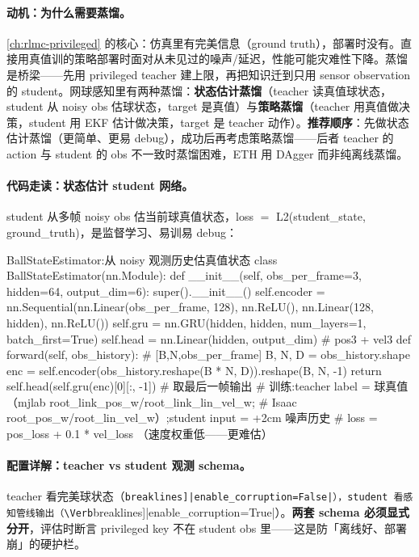 \paragraph{动机：为什么需要蒸馏。}\cref{ch:rlmc-privileged} 的核心：仿真里有完美信息（ground truth），部署时没有。直接用真值训的策略部署时面对从未见过的噪声/延迟，性能可能灾难性下降。蒸馏是桥梁——先用 privileged teacher 建上限，再把知识迁到只用 sensor observation 的 student。网球感知里有两种蒸馏：\textbf{状态估计蒸馏}（teacher 读真值球状态，student 从 noisy obs 估球状态，target 是真值）与\textbf{策略蒸馏}（teacher 用真值做决策，student 用 EKF 估计做决策，target 是 teacher 动作）。\textbf{推荐顺序}：先做状态估计蒸馏（更简单、更易 debug），成功后再考虑策略蒸馏——后者 teacher 的 action 与 student 的 obs 不一致时蒸馏困难，ETH 用 DAgger 而非纯离线蒸馏\cite{tennis_eth2025badminton}。

\paragraph{代码走读：状态估计 student 网络。}student 从多帧 noisy obs 估当前球真值状态，loss $=$ L2(student\_state, ground\_truth)，是监督学习、易训易 debug：

\begin{codebox}[Python]{BallStateEstimator:从 noisy 观测历史估真值状态}
class BallStateEstimator(nn.Module):
    def __init__(self, obs_per_frame=3, hidden=64, output_dim=6):
        super().__init__()
        self.encoder = nn.Sequential(nn.Linear(obs_per_frame, 128), nn.ReLU(),
                                     nn.Linear(128, hidden), nn.ReLU())
        self.gru = nn.GRU(hidden, hidden, num_layers=1, batch_first=True)
        self.head = nn.Linear(hidden, output_dim)            # pos3 + vel3
    def forward(self, obs_history):                          # [B,N,obs_per_frame]
        B, N, D = obs_history.shape
        enc = self.encoder(obs_history.reshape(B * N, D)).reshape(B, N, -1)
        return self.head(self.gru(enc)[0][:, -1])            # 取最后一帧输出
# 训练:teacher label = 球真值（mjlab root_link_pos_w/root_link_lin_vel_w;
#       Isaac root_pos_w/root_lin_vel_w）;student input = +2cm 噪声历史
# loss = pos_loss + 0.1 * vel_loss   （速度权重低——更难估）
\end{codebox}

\paragraph{配置详解：teacher vs student 观测 schema。}teacher 看完美球状态（\Verb[breaklines]|enable_corruption=False|），student 看感知管线输出（\Verb[breaklines]|enable_corruption=True|）。\textbf{两套 schema 必须显式分开}，评估时断言 privileged key 不在 student obs 里——这是防「离线好、部署崩」的硬护栏。

